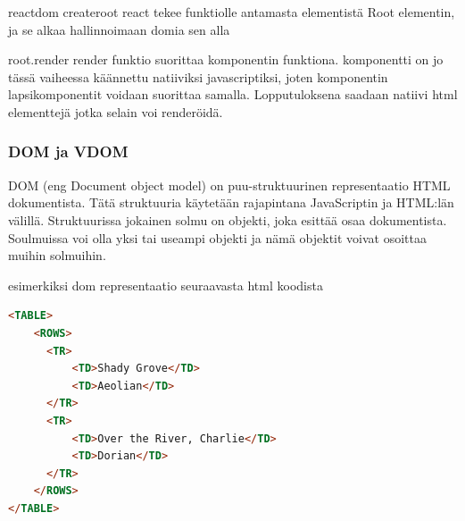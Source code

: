 reactdom createroot
react tekee funktiolle antamasta elementistä Root elementin, ja se alkaa hallinnoimaan domia sen alla
\medskip


root.render
render funktio suorittaa komponentin funktiona. komponentti on jo tässä vaiheessa käännettu natiiviksi javascriptiksi, 
joten komponentin lapsikomponentit voidaan suorittaa samalla. Lopputuloksena saadaan natiivi html elementtejä jotka selain voi renderöidä.

\medskip



\subsubsection{DOM ja VDOM}





DOM (eng Document object model) on puu-struktuurinen representaatio HTML dokumentista.
Tätä struktuuria käytetään rajapintana JavaScriptin ja HTML:län välillä. 
Struktuurissa jokainen solmu on objekti, joka esittää osaa dokumentista. 
Soulmuissa voi olla yksi tai useampi objekti ja nämä objektit voivat osoittaa muihin solmuihin.



esimerkiksi dom representaatio seuraavasta html koodista

    
\begin{tcolorbox}
\begin{lstlisting}[language=html]
<TABLE>
    <ROWS> 
      <TR> 
          <TD>Shady Grove</TD>
          <TD>Aeolian</TD> 
      </TR> 
      <TR>
          <TD>Over the River, Charlie</TD>
          <TD>Dorian</TD> 
      </TR> 
    </ROWS>
</TABLE>
\end{lstlisting}
\end{tcolorbox}


